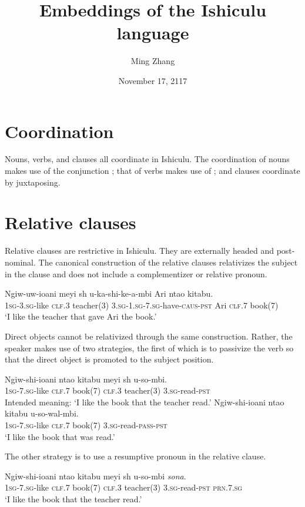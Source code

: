 \documentclass[12pt, oneside]{article}
\title{Embeddings of the Ishiculu language}
\author{Ming Zhang}
\date{November 17, 2117}
\let\ipa\textipa
\begin{document}
\maketitle

\section{Coordination}

Nouns, verbs, and clauses all coordinate in Ishiculu. The coordination of nouns makes use of the conjunction \textit{\ipa{h7}}; that of verbs makes use of \textit{\ipa{futi}}; and clauses coordinate by juxtaposing.

\section{Relative clauses}

Relative clauses are restrictive in Ishiculu. They are externally headed and post-nominal. The canonical construction of the relative clauses relativizes the subject in the clause and does not include a complementizer or relative pronoun.

\begin{exe}
\ex
\gll Ngiw-uw-ioani meyi {sh\textramshorns} u-ka-shi-ke-\textbeltl a-mbi Ari nta\textbeltl o kitabu. \\
\textsc{1sg}-\textsc{3.sg}-like \textsc{clf.3} teacher(3) \textsc{3.sg}-\textsc{1.sg}-\textsc{7.sg}-have-\textsc{caus}-\textsc{pst} Ari \textsc{clf.7} book(7) \\
\trans `I like the teacher that gave Ari the book.'
\end{exe}

Direct objects cannot be relativized through the same construction. Rather, the speaker makes use of two strategies, the first of which is to passivize the verb so that the direct object is promoted to the subject position.

\begin{exe}
\ex
\gll * Ngiw-shi-ioani nta\textbeltl o kitabu meyi {sh\textramshorns} u-so-mbi. \\
{} \textsc{1sg}-\textsc{7.sg}-like \textsc{clf.7} book(7) \textsc{clf.3} teacher(3) \textsc{3.sg}-read-\textsc{pst} \\
\trans Intended meaning: `I like the book that the teacher read.'
\ex
\gll Ngiw-shi-ioani nta\textbeltl o kitabu u-so-wal\textramshorns-mbi. \\
\textsc{1sg}-\textsc{7.sg}-like \textsc{clf.7} book(7)  \textsc{3.sg}-read-\textsc{pass}-\textsc{pst} \\
\trans `I like the book that was read.'
\end{exe}

The other strategy is to use a resumptive pronoun in the relative clause.

\begin{exe}
\ex
\gll Ngiw-shi-ioani nta\textbeltl o kitabu meyi {sh\textramshorns} u-so-mbi \textit{sona}. \\
\textsc{1sg}-\textsc{7.sg}-like \textsc{clf.7} book(7) \textsc{clf.3} teacher(3) \textsc{3.sg}-read-\textsc{pst} \textsc{prn.7.sg} \\
\trans `I like the book that the teacher read.'
\end{exe}
\end{document}
